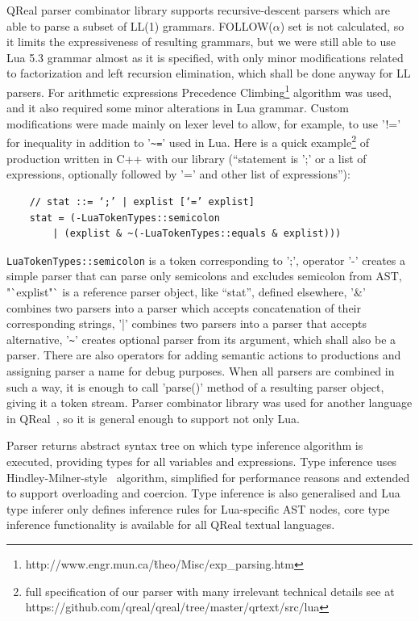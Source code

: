 \documentclass[conference]{IEEEtran}
\begin{document}
{QReal parser combinator library supports recursive-descent parsers which are able to parse a subset of LL(1) grammars. FOLLOW($\alpha$) set is not calculated, so it limits the expressiveness of resulting grammars, but we were still able to use Lua 5.3 grammar almost as it is specified, with only minor modifications related to factorization and left recursion elimination, which shall be done anyway for LL parsers. For arithmetic expressions Precedence Climbing\footnote{http://www.engr.mun.ca/\~theo/Misc/exp\_parsing.htm} algorithm was used, and it also required some minor alterations in Lua grammar. Custom modifications were made mainly on lexer level to allow, for example, to use '!=' for inequality in addition to '\verb|~=|' used in Lua. Here is a quick example\footnote{full specification of our parser with many irrelevant technical details see at https://github.com/qreal/qreal/tree/master/qrtext/src/lua} of production written in C++ with our library ("`statement is ';' or a list of expressions, optionally followed by '=' and other list of expressions"'):
\begin{verbatim}
	// stat ::= ‘;’ | explist [‘=’ explist]
	stat = (-LuaTokenTypes::semicolon 
	    | (explist & ~(-LuaTokenTypes::equals & explist)))
\end{verbatim}

\verb|LuaTokenTypes::semicolon| is a token corresponding to ';', operator '-' creates a simple parser that can parse only semicolons and excludes semicolon from AST, "`explist"` is a reference parser object, like "`stat"', defined elsewhere, '\&' combines two parsers into a parser which accepts concatenation of their corresponding strings, '|' combines two parsers into a parser that accepts alternative, '\verb|~|' creates optional parser from its argument, which shall also be a parser. There are also operators for adding semantic actions to productions and assigning parser a name for debug purposes. When all parsers are combined in such a way, it is enough to call 'parse()' method of a resulting parser object, giving it a token stream. Parser combinator library was used for another language in QReal~\cite{tikhonova2015generation}, so it is general enough to support not only Lua.

Parser returns abstract syntax tree on which type inference algorithm is executed, providing types for all variables and expressions. Type inference uses Hindley-Milner-style~\cite{damas1982principal} algorithm, simplified for performance reasons and extended to support overloading and coercion. Type inference is also generalised and Lua type inferer only defines inference rules for Lua-specific AST nodes, core type inference functionality is available for all QReal textual languages.

}
\end{document}
